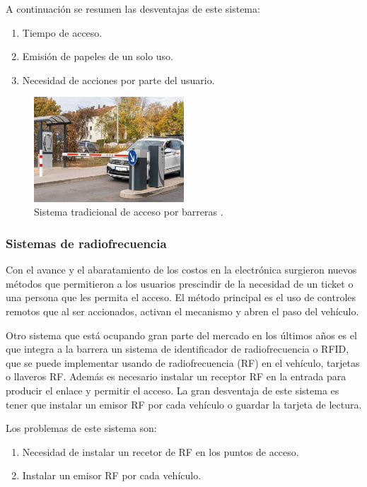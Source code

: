A continuación se resumen las desventajas de este sistema:

\begin{enumerate}
    \item Tiempo de acceso.
    \item Emisión de papeles de un solo uso.
    \item Necesidad de acciones por parte del usuario.
\end{enumerate}

\begin{figure}[bth]
    \centering
    \includegraphics[width=0.5\textwidth]{imgs/sistema-control-acceso-barreras.jpg}
    \caption{Sistema tradicional de acceso por barreras \cite{integralia_sistema_2019}.}
    \label{fig:sistema-tradicional}
\end{figure}

\subsubsection{Sistemas de radiofrecuencia}

Con el avance y el abaratamiento de los costos en la electrónica surgieron nuevos métodos que permitieron a los usuarios prescindir de la necesidad de un ticket o una persona que les permita el acceso. El método principal es el uso de controles remotos que al ser accionados, activan el mecanismo y abren el paso del vehículo.

Otro sistema que está ocupando gran parte del mercado en los últimos años es el que integra a la barrera un sistema de identificador de radiofrecuencia o RFID, que se puede implementar usando de radiofrecuencia (RF) en el vehículo, tarjetas o llaveros RF. Además es necesario instalar un receptor RF en la entrada para producir el enlace y permitir el acceso.
La gran desventaja de este sistema es tener que instalar un emisor RF por cada vehículo o guardar la tarjeta de lectura.

Los problemas de este sistema son:

\begin{enumerate}
    \item Necesidad de instalar un recetor de RF en los puntos de acceso.
    \item Instalar un emisor RF por cada vehículo.
\end{enumerate}

